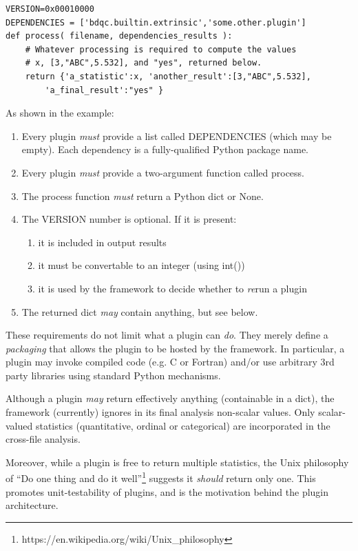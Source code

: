 \documentclass {article}
\begin{document}
\begin{verbatim}
VERSION=0x00010000
DEPENDENCIES = ['bdqc.builtin.extrinsic','some.other.plugin']
def process( filename, dependencies_results ):
	# Whatever processing is required to compute the values
	# x, [3,"ABC",5.532], and "yes", returned below.
	return {'a_statistic':x, 'another_result':[3,"ABC",5.532],
   		'a_final_result':"yes" }
\end{verbatim}

As shown in the example:
\begin{enumerate}
\item Every plugin \emph{must} provide a list called DEPENDENCIES (which may be empty).
	Each dependency is a fully-qualified Python package name.
\item Every plugin \emph{must} provide a two-argument function called process.
\item The process function \emph{must} return a Python dict or None.
\item The VERSION number is optional. If it is present:
	\begin{enumerate}
	\item it is included in output results
	\item it must be convertable to an integer (using int())
	\item it is used by the framework to decide whether to \emph{re}run a plugin
	\end{enumerate}
\item The returned dict \emph{may} contain anything, but see below.
\end{enumerate}

These requirements do not limit what a plugin can \emph{do}.
They merely define a \emph{packaging} that allows the plugin to be hosted
by the framework. In particular, a plugin may invoke compiled code (e.g.
C or Fortran) and/or use arbitrary 3rd party libraries using standard
Python mechanisms.

Although a plugin \emph{may} return effectively anything (containable in a
dict), the framework (currently) ignores in its final analysis non-scalar
values. Only scalar-valued statistics (quantitative, ordinal or
categorical) are incorporated in the cross-file analysis.

Moreover, while a plugin is free to return multiple statistics,
the Unix philosophy of ``Do one thing and do it well''\footnote{
https://en.wikipedia.org/wiki/Unix\_philosophy}
suggests it \emph{should} return only one.
This promotes unit-testability of plugins, and is the
motivation behind the plugin architecture.
\end{document}
